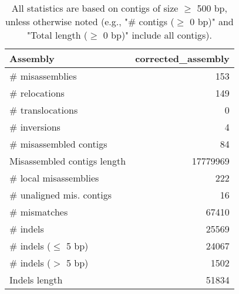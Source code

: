\documentclass[12pt,a4paper]{article}
\begin{document}
\begin{table}[ht]
\begin{center}
\caption{All statistics are based on contigs of size $\geq$ 500 bp, unless otherwise noted (e.g., "\# contigs ($\geq$ 0 bp)" and "Total length ($\geq$ 0 bp)" include all contigs).}
\begin{tabular}{|l*{1}{|r}|}
\hline
Assembly & corrected\_assembly \\ \hline
\# misassemblies & 153 \\ \hline
\hspace{5mm}\# relocations & 149 \\ \hline
\hspace{5mm}\# translocations & 0 \\ \hline
\hspace{5mm}\# inversions & 4 \\ \hline
\# misassembled contigs & 84 \\ \hline
Misassembled contigs length & 17779969 \\ \hline
\# local misassemblies & 222 \\ \hline
\# unaligned mis. contigs & 16 \\ \hline
\# mismatches & 67410 \\ \hline
\# indels & 25569 \\ \hline
\hspace{5mm}\# indels ($\leq$ 5 bp) & 24067 \\ \hline
\hspace{5mm}\# indels ($>$ 5 bp) & 1502 \\ \hline
Indels length & 51834 \\ \hline
\end{tabular}
\end{center}
\end{table}
\end{document}
